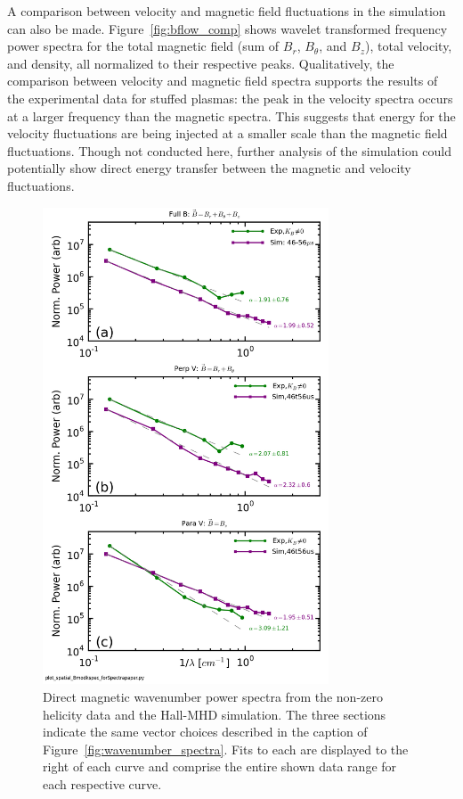 \documentclass[aip,prl,amsmath,amssymb,reprint,superscriptaddress]{revtex4-1} %
\begin{document}
A comparison between velocity and magnetic field fluctuations in the simulation can also be made. Figure~\ref{fig:bflow_comp} shows wavelet transformed frequency power spectra for the total magnetic field (sum of $B_{r}$, $B_{\theta}$, and $B_{z}$), total velocity, and density, all normalized to their respective peaks. Qualitatively, the comparison between velocity and magnetic field spectra supports the results of the experimental data for stuffed plasmas: the peak in the velocity spectra occurs at a larger frequency than the magnetic spectra. This suggests that energy for the velocity fluctuations are being injected at a smaller scale than the magnetic field fluctuations. Though not conducted here, further analysis of the simulation could potentially show direct energy transfer between the magnetic and velocity fluctuations.

\begin{figure}[!htbp]
\centerline{
\includegraphics[width=8.5cm]{Bmod_FFTwavenumberspectra_wFits_40t60us_simulationcomparison}}
\caption{\label{fig:sim_wavenumber_comp} Direct magnetic wavenumber power spectra from the non-zero helicity data and the Hall-MHD simulation. The three sections indicate the same vector choices described in the caption of Figure~\ref{fig:wavenumber_spectra}. Fits to each are displayed to the right of each curve and comprise the entire shown data range for each respective curve.}
\end{figure}
\end{document}
